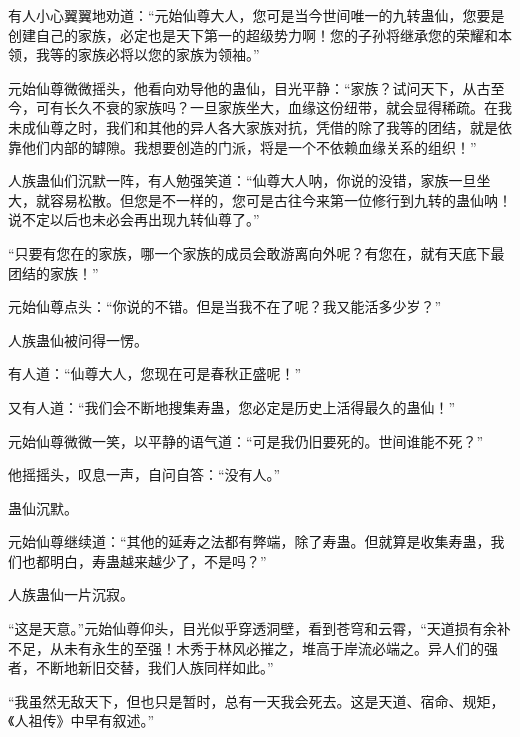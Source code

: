 \begin{this_body}
有人小心翼翼地劝道：“元始仙尊大人，您可是当今世间唯一的九转蛊仙，您要是创建自己的家族，必定也是天下第一的超级势力啊！您的子孙将继承您的荣耀和本领，我等的家族必将以您的家族为领袖。”

元始仙尊微微摇头，他看向劝导他的蛊仙，目光平静：“家族？试问天下，从古至今，可有长久不衰的家族吗？一旦家族坐大，血缘这份纽带，就会显得稀疏。在我未成仙尊之时，我们和其他的异人各大家族对抗，凭借的除了我等的团结，就是依靠他们内部的罅隙。我想要创造的门派，将是一个不依赖血缘关系的组织！”

人族蛊仙们沉默一阵，有人勉强笑道：“仙尊大人呐，你说的没错，家族一旦坐大，就容易松散。但您是不一样的，您可是古往今来第一位修行到九转的蛊仙呐！说不定以后也未必会再出现九转仙尊了。”

“只要有您在的家族，哪一个家族的成员会敢游离向外呢？有您在，就有天底下最团结的家族！”

元始仙尊点头：“你说的不错。但是当我不在了呢？我又能活多少岁？”

人族蛊仙被问得一愣。

有人道：“仙尊大人，您现在可是春秋正盛呢！”

又有人道：“我们会不断地搜集寿蛊，您必定是历史上活得最久的蛊仙！”

元始仙尊微微一笑，以平静的语气道：“可是我仍旧要死的。世间谁能不死？”

他摇摇头，叹息一声，自问自答：“没有人。”

蛊仙沉默。

元始仙尊继续道：“其他的延寿之法都有弊端，除了寿蛊。但就算是收集寿蛊，我们也都明白，寿蛊越来越少了，不是吗？”

人族蛊仙一片沉寂。

“这是天意。”元始仙尊仰头，目光似乎穿透洞壁，看到苍穹和云霄，“天道损有余补不足，从未有永生的至强！木秀于林风必摧之，堆高于岸流必端之。异人们的强者，不断地新旧交替，我们人族同样如此。”

“我虽然无敌天下，但也只是暂时，总有一天我会死去。这是天道、宿命、规矩，《人祖传》中早有叙述。”

\end{this_body}

